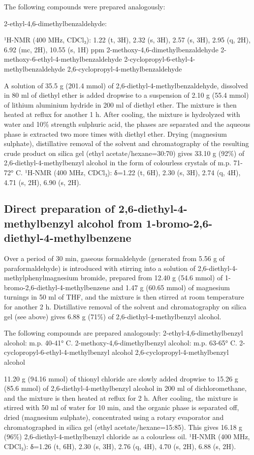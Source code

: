 \documentclass[11pt,a4paper]{article}
\begin{document}
The following compounds were prepared analogously:

2-ethyl-4,6-dimethylbenzaldehyde:

¹H-NMR (400 MHz, CDCl₃): 1.22 (t, 3H), 2.32 (s, 3H), 2.57 (s, 3H), 2.95 (q, 2H), 6.92 (mc, 2H), 10.55 (s, 1H) ppm 2-methoxy-4,6-dimethylbenzaldehyde 2-methoxy-6-ethyl-4-methylbenzaldehyde 2-cyclopropyl-6-ethyl-4-methylbenzaldehyde 2,6-cyclopropyl-4-methylbenzaldehyde

A solution of 35.5 g (201.4 mmol) of 2,6-diethyl-4-methylbenzaldehyde, dissolved in 80 ml of diethyl ether is added dropwise to a suspension of 2.10 g (55.4 mmol) of lithium aluminium hydride in 200 ml of diethyl ether. The mixture is then heated at reflux for another 1 h. After cooling, the mixture is hydrolyzed with water and 10\% strength sulphuric acid, the phases are separated and the aqueous phase is extracted two more times with diethyl ether. Drying (magnesium sulphate), distillative removal of the solvent and chromatography of the resulting crude product on silica gel (ethyl acetate/hexane=30:70) gives 33.10 g (92\%) of 2,6-diethyl-4-methylbenzyl alcohol in the form of colourless crystals of m.p. 71-72° C. ¹H-NMR (400 MHz, CDCl₃): δ=1.22 (t, 6H), 2.30 (s, 3H), 2.74 (q, 4H), 4.71 (s, 2H), 6.90 (s, 2H).

\subsection{Direct preparation of 2,6-diethyl-4-methylbenzyl alcohol from 1-bromo-2,6-diethyl-4-methylbenzene}

Over a period of 30 min, gaseous formaldehyde (generated from 5.56 g of paraformaldehyde) is introduced with stirring into a solution of 2,6-diethyl-4-methylphenylmagnesium bromide, prepared from 12.40 g (54.6 mmol) of 1-bromo-2,6-diethyl-4-methylbenzene and 1.47 g (60.65 mmol) of magnesium turnings in 50 ml of THF, and the mixture is then stirred at room temperature for another 2 h. Distillative removal of the solvent and chromatography on silica gel (see above) gives 6.88 g (71\%) of 2,6-diethyl-4-methylbenzyl alcohol.

The following compounds are prepared analogously: 2-ethyl-4,6-dimethylbenzyl alcohol: m.p. 40-41° C. 2-methoxy-4,6-dimethylbenzyl alcohol: m.p. 63-65° C. 2-cyclopropyl-6-ethyl-4-methylbenzyl alcohol 2,6-cyclopropyl-4-methylbenzyl alcohol

11.20 g (94.16 mmol) of thionyl chloride are slowly added dropwise to 15.26 g (85.6 mmol) of 2,6-diethyl-4-methylbenzyl alcohol in 200 ml of dichloromethane, and the mixture is then heated at reflux for 2 h. After cooling, the mixture is stirred with 50 ml of water for 10 min, and the organic phase is separated off, dried (magnesium sulphate), concentrated using a rotary evaporator and chromatographed in silica gel (ethyl acetate/hexane=15:85). This gives 16.18 g (96\%) 2,6-diethyl-4-methylbenzyl chloride as a colourless oil. ¹H-NMR (400 MHz, CDCl₃): δ=1.26 (t, 6H), 2.30 (s, 3H), 2.76 (q, 4H), 4.70 (s, 2H), 6.88 (s, 2H).
\end{document}
